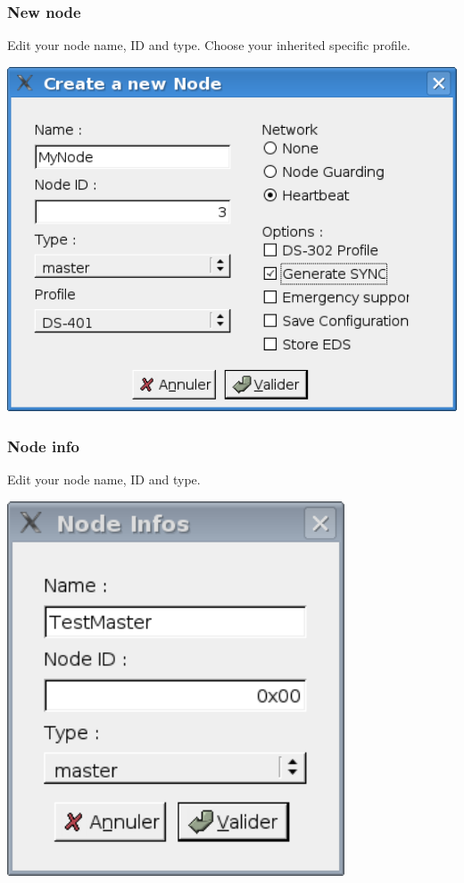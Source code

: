 \documentclass[12pt,twoside]{article}
\begin{document}
\subsubsection{New node}
Edit your node name, ID and type. Choose your inherited specific
profile.

 \begin{center}
   \includegraphics[width=15cm]{Pictures/10000201000001CB0000015F4FC09B68.png}
\end{center}

\subsubsection{Node info}
Edit your node name, ID and type.

 \begin{center}
   \includegraphics[width=10cm]{Pictures/10000201000001010000011DA724D25C.png}
\end{center}
\end{document}
